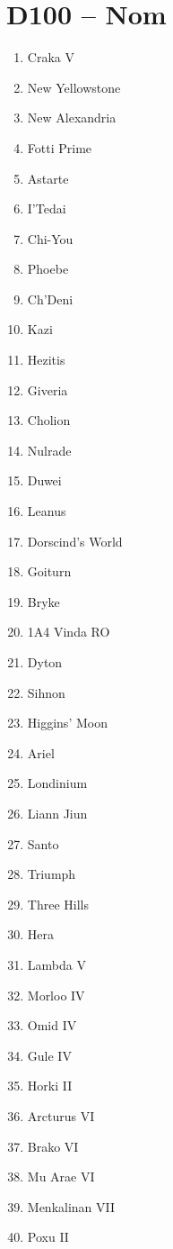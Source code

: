 \documentclass{article}
\begin{document}
\section*{D100 -- Nom}
\begin{multicols}{4}
	\begin{enumerate}
		\item Craka V 
		\item New Yellowstone 
		\item New Alexandria 
		\item Fotti Prime 
		\item Astarte 
		\item I'Tedai 
		\item Chi-You 
		\item Phoebe 
		\item Ch'Deni 
		\item Kazi
		\item Hezitis 
		\item Giveria 
		\item Cholion 
		\item Nulrade 
		\item Duwei 
		\item Leanus 
		\item Dorscind's World 
		\item Goiturn 
		\item Bryke 
		\item 1A4 Vinda RO
		\item Dyton
		\item Sihnon
		\item Higgins' Moon
		\item Ariel
		\item Londinium
		\item Liann Jiun
		\item Santo
		\item Triumph
		\item Three Hills
		\item Hera
		\item Lambda V
		\item Morloo IV
		\item Omid IV
		\item Gule IV
		\item Horki II
		\item Arcturus VI
		\item Brako VI
		\item Mu Arae VI
		\item Menkalinan VII
		\item Poxu II

\end{enumerate}
\end{multicols}
\end{document}
